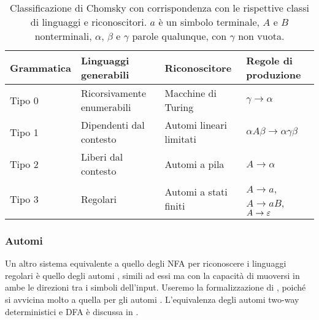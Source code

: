\begin{table}
	\caption{Classificazione di Chomsky con corrispondenza con le rispettive classi di linguaggi e riconoscitori. $a$ è un simbolo terminale, $A$ e $B$ nonterminali, $\alpha$, $\beta$ e $\gamma$ parole qualunque, con $\gamma$ non vuota.}
	\label{tab:prel:chomskyhier}
	\centering
	\begin{tabularx}{\textwidth}{lXXl}
		\toprule
		\textbf{Grammatica} & \textbf{Linguaggi generabili} & \textbf{Riconoscitore}  & \textbf{Regole di produzione}         \\
		\midrule
		Tipo 0              & Ricorsivamente enumerabili    & Macchine di Turing      & $\gamma\to\alpha$                     \\
		Tipo 1              & Dipendenti dal contesto       & Automi lineari limitati & $\alpha A\beta\to\alpha\gamma\beta$   \\
		Tipo 2              & Liberi dal contesto           & Automi a pila           & $A\to\alpha$                          \\
		Tipo 3              & Regolari                      & Automi a stati finiti   & $A\to a$, $A\to aB$, $A\to\varepsilon$ \\
		\bottomrule
	\end{tabularx}
\end{table}

\subsubsection{Automi }
Un altro sistema equivalente a quello degli NFA per riconoscere i linguaggi regolari è quello degli automi , simili ad essi ma con la capacità di muoversi in ambe le direzioni tra i simboli dell'input. Useremo la formalizzazione di \cite{Pighizzini:14:limitedRE}, poiché si avvicina molto a quella per gli automi . L'equivalenza degli automi two-way deterministici e DFA è discussa in \cite{Shallit:09:secondLFA}.

